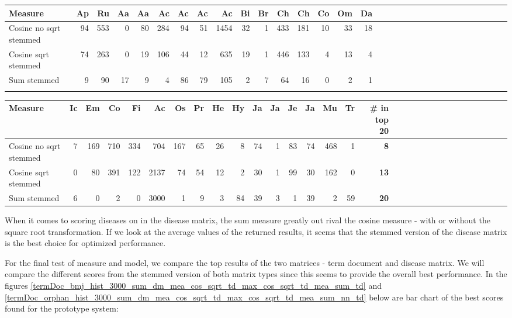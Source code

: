 \begin{table}[H]
  \label{testResult_diseaseMatrix_orphan_hist_NOTnorm_3000_s_cos_sqrt_cos_sum_nn}
  \begin{tiny}
    \begin{tabular}{|l|r|r|r|r|r|r|r|r|r|r|r|r|r|r|r|r|r|r|r|r|r|r|r|r|r|r|r|r|r|r|r|}
      \hline
      Measure &Ap&Ru&Aa&Aa&Ac&Ac&Ac&Ac&Bi&Br&Ch&Ch&Co&Om&Da\\
      \hline
      Cosine no sqrt stemmed &94&553&0&80&284&94&51&1454&32&1&433&181&10&33&18 \\
      \hline
      Cosine sqrt stemmed &74&263&0&19&106&44&12&635&19&1&446&133&4&13&4 \\
      \hline
      Sum stemmed &9&90&17&9&4&86&79&105&2&7&64&16&0&2&1\\
      \hline
      \multicolumn{16}{c}{} \\
    \end{tabular}
    \begin{tabular}{|l|r|r|r|r|r|r|r|r|r|r|r|r|r|r|r|r|r|r|r|r|r|r|r|r|r|r|r|r|r|r|}
      \hline
      Measure &Ic&Em&Co&Fi&Ac&Os&Pr&He&Hy&Ja&Ja&Je&Ja&Mu&Tr &  \scriptsize{\textbf{\# in top 20}} \\
      \hline
      Cosine no sqrt stemmed &7&169&710&334&704&167&65&26&8&74&1&83&74&468&1 & \scriptsize{\textbf{8}} \\
      \hline
      Cosine sqrt stemmed &0&80&391&122&2137&74&54&12&2&30&1&99&30&162&0 &\scriptsize{\textbf{13}} \\
      \hline
      Sum stemmed &6&0&2&0&3000&1&9&3&84&39&3&1&39&2&59 & \scriptsize{\textbf{20}} \\
      \hline
    \end{tabular}
  \end{tiny}
\end{table}

When it comes to scoring diseases on in the disease matrix, the sum measure greatly out rival the 
cosine measure - with or without the square root transformation. If we look at the average values 
of the returned results, it seems that the stemmed version of the disease matrix is the best choice 
for optimized performance.

For the final test of measure and model, we compare the top results of the two matrices - term 
document and disease matrix. We will compare the different scores from the stemmed version of 
both matrix types since this seems to provide the overall best performance. In the figures 
\ref{termDoc_bmj_hist_3000_sum_dm_mea_cos_sqrt_td_max_cos_sqrt_td_mea_sum_td} and 
\ref{termDoc_orphan_hist_3000_sum_dm_mea_cos_sqrt_td_max_cos_sqrt_td_mea_sum_nn_td} below are 
bar chart of the best scores found for the prototype system:

